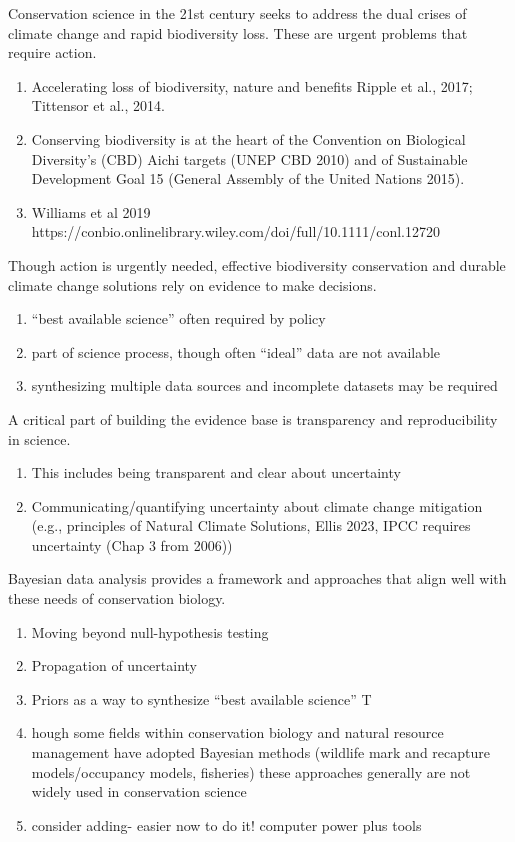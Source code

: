 \documentclass{article}
\begin{document}
\par Conservation science in the 21st century seeks to address the dual crises of  climate change and rapid biodiversity loss. These are urgent problems that require action.
\begin{enumerate}
\item Accelerating loss of biodiversity, nature and benefits \citep{brondizio2019assessing} Ripple et al., 2017; Tittensor et al., 2014. 
\item Conserving biodiversity is at the heart of the Convention on Biological Diversity's (CBD) Aichi targets (UNEP CBD 2010) and of Sustainable Development Goal 15 (General Assembly of the United Nations 2015).
\item Williams et al 2019 https://conbio.onlinelibrary.wiley.com/doi/full/10.1111/conl.12720
\end{enumerate}
\par Though action is urgently needed, effective biodiversity conservation and durable climate change solutions rely on evidence to make decisions. 
\begin{enumerate}
\item “best available science” often required by  policy
\item part of science process, though often “ideal” data are not available
\item synthesizing multiple data sources  and incomplete datasets may be required 
\end{enumerate}


\par A critical part of building the evidence base is transparency and reproducibility in science. 
\begin{enumerate}
\item This includes being transparent and clear about uncertainty
\item Communicating/quantifying uncertainty about climate change mitigation (e.g., principles of Natural Climate Solutions, Ellis 2023, IPCC requires uncertainty (Chap 3 from 2006))

\end{enumerate}

\par Bayesian data analysis provides a framework and approaches that align well with these needs of conservation biology.
\begin{enumerate}

\item Moving beyond null-hypothesis testing 
\item Propagation of uncertainty
\item Priors as a way to synthesize “best available science”
T\item hough some fields within conservation biology and natural resource management have adopted Bayesian methods (wildlife mark and recapture models/occupancy models, fisheries) these approaches generally  are not widely used in conservation science
\item consider adding- easier now to do it! computer power plus tools
\end{enumerate}
\end{document}
